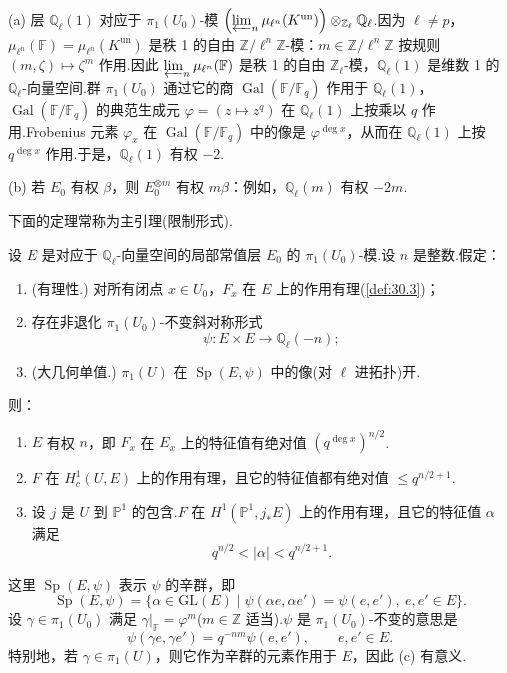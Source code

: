 \begin{example}\label{ex:30.5}
(a) 层 $\mathbb{Q}_{\ell}(1)$ 对应于 $\pi_1(U_0)$-模 $\left( \varprojlim_{n} \mu_{\ell^{n}}(K^{\mathrm{un}}) \right) \otimes_{\mathbb{Z}_{\ell}} \mathbb{Q}_{\ell}$.因为 $\ell \neq p$，$\mu_{\ell^{n}}(\mathbb{F}) = \mu_{\ell^{n}}(K^{\mathrm{un}})$ 是秩 1 的自由 $\mathbb{Z}/\ell^{n}\mathbb{Z}$-模：$m \in \mathbb{Z}/\ell^{n}\mathbb{Z}$ 按规则 $(m, \zeta) \mapsto \zeta^{m}$ 作用.因此 $\varprojlim_{n} \mu_{\ell^{n}}(\mathbb{F})$ 是秩 1 的自由 $\mathbb{Z}_{\ell}$-模，$\mathbb{Q}_{\ell}(1)$ 是维数 1 的 $\mathbb{Q}_{\ell}$-向量空间.群 $\pi_1(U_0)$ 通过它的商 $\operatorname{Gal}(\mathbb{F}/\mathbb{F}_q)$ 作用于 $\mathbb{Q}_{\ell}(1)$，$\operatorname{Gal}(\mathbb{F}/\mathbb{F}_q)$ 的典范生成元 $\varphi = (z \mapsto z^{q})$ 在 $\mathbb{Q}_{\ell}(1)$ 上按乘以 $q$ 作用.Frobenius 元素 $\varphi_x$ 在 $\operatorname{Gal}(\mathbb{F}/\mathbb{F}_q)$ 中的像是 $\varphi^{\deg x}$，从而在 $\mathbb{Q}_{\ell}(1)$ 上按 $q^{\deg x}$ 作用.于是，$\mathbb{Q}_{\ell}(1)$ 有权 $-2$.

(b) 若 $E_0$ 有权 $\beta$，则 $E^{\otimes m}_0$ 有权 $m\beta$：例如，$\mathbb{Q}_{\ell}(m)$ 有权 $-2m$.
\end{example}

下面的定理常称为主引理(限制形式).

\begin{theorem}\label{thm:30.6}
设 $E$ 是对应于 $\mathbb{Q}_{\ell}$-向量空间的局部常值层 $E_0$ 的 $\pi_1(U_0)$-模.设 $n$ 是整数.假定：
\begin{enumerate}
  \item (有理性.) 对所有闭点 $x \in U_0$，$F_x$ 在 $E$ 上的作用有理(\ref{def:30.3})；
  \item 存在非退化 $\pi_1(U_0)$-不变斜对称形式
  \[
  \psi \colon E \times E \to \mathbb{Q}_{\ell}(-n);
  \]
  \item (大几何单值.) $\pi_1(U)$ 在 $\operatorname{Sp}(E, \psi)$ 中的像(对 $\ell$ 进拓扑)开.
\end{enumerate}
则：
\begin{enumerate}
  \item $E$ 有权 $n$，即 $F_x$ 在 $E_x$ 上的特征值有绝对值 $(q^{\deg x})^{n/2}$.
  \item $F$ 在 $H^{1}_{c}(U, E)$ 上的作用有理，且它的特征值都有绝对值 $\leq q^{n/2+1}$.
  \item 设 $j$ 是 $U$ 到 $\mathbb{P}^{1}$ 的包含.$F$ 在 $H^{1}(\mathbb{P}^{1}, j_{*}E)$ 上的作用有理，且它的特征值 $\alpha$ 满足
  \[
  q^{n/2} < |\alpha| < q^{n/2+1}.
  \]
\end{enumerate}
这里 $\operatorname{Sp}(E, \psi)$ 表示 $\psi$ 的辛群，即
\[
\operatorname{Sp}(E, \psi) = \{\alpha \in \mathrm{GL}(E) \mid \psi(\alpha e, \alpha e') = \psi(e, e'), \ e, e' \in E\}.
\]
设 $\gamma \in \pi_1(U_0)$ 满足 $\gamma|_{\mathbb{F}} = \varphi^{m}$($m \in \mathbb{Z}$ 适当).$\psi$ 是 $\pi_1(U_0)$-不变的意思是
\[
\psi(\gamma e, \gamma e') = q^{-nm}\psi(e, e'), \qquad e, e' \in E.
\]
特别地，若 $\gamma \in \pi_1(U)$，则它作为辛群的元素作用于 $E$，因此 (c) 有意义.
\end{theorem}


